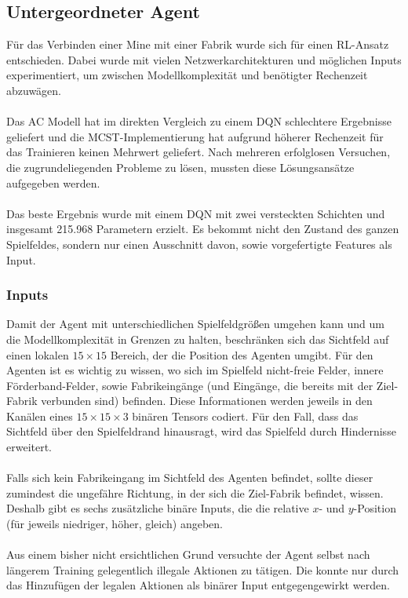 \subsection{Untergeordneter Agent}
Für das Verbinden einer Mine mit einer Fabrik wurde sich für einen RL-Ansatz entschieden. Dabei wurde mit vielen Netzwerkarchitekturen und möglichen Inputs experimentiert, um zwischen Modellkomplexität und benötigter Rechenzeit abzuwägen. 
\\\\
Das AC Modell hat im direkten Vergleich zu einem DQN schlechtere Ergebnisse geliefert und die MCST-Implementierung hat aufgrund höherer Rechenzeit für das Trainieren keinen Mehrwert geliefert. Nach mehreren erfolglosen Versuchen, die zugrundeliegenden Probleme zu lösen, mussten diese Lösungsansätze aufgegeben werden.
\\\\
Das beste Ergebnis wurde mit einem DQN mit zwei versteckten Schichten und insgesamt 215.968 Parametern erzielt. Es bekommt nicht den Zustand des ganzen Spielfeldes, sondern nur einen Ausschnitt davon, sowie vorgefertigte Features als Input.
\subsubsection*{Inputs}
Damit der Agent mit unterschiedlichen Spielfeldgrößen umgehen kann und um die Modellkomplexität in Grenzen zu halten, beschränken sich das Sichtfeld auf einen lokalen $15\times15$ Bereich, der die Position des Agenten umgibt. 
Für den Agenten ist es wichtig zu wissen, wo sich im Spielfeld nicht-freie Felder, innere Förderband-Felder, sowie Fabrikeingänge (und Eingänge, die bereits mit der Ziel-Fabrik verbunden sind) befinden. Diese Informationen werden jeweils in den Kanälen eines  $15\times15\times3$ binären Tensors codiert. 
Für den Fall, dass das Sichtfeld über den Spielfeldrand hinausragt, wird das Spielfeld durch Hindernisse erweitert.
\\\\
Falls sich kein Fabrikeingang im Sichtfeld des Agenten befindet, sollte dieser zumindest die ungefähre Richtung, in der sich die Ziel-Fabrik befindet, wissen. Deshalb gibt es sechs zusätzliche binäre Inputs, die die relative $x$- und $y$-Position (für jeweils niedriger, höher, gleich) angeben.
\\\\
Aus einem bisher nicht ersichtlichen Grund versuchte der Agent selbst nach längerem Training gelegentlich illegale Aktionen zu tätigen. Die konnte nur durch das Hinzufügen der legalen Aktionen als binärer Input entgegengewirkt werden.


